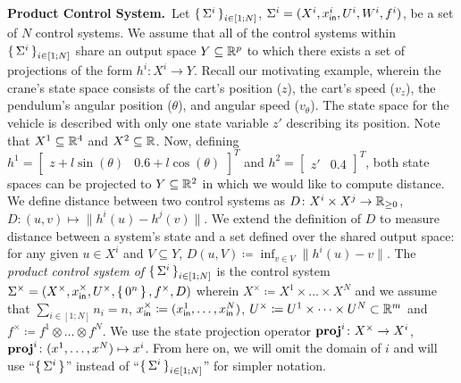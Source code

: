 
\smallskip
\noindent\textbf{Product Control System.}\
Let $\set{\Sigma^i}_{i\in [1;N]}$, $\Sigma^i=(X^i,x_{\mathsf{in}}^i,U^i,W^i,f^i)$, be a set of $N$ control systems. 
We assume that all of the control systems within $\set{\Sigma^i}_{i\in [1;N]}$ share an output space $Y\subseteq\mathbb{R}^p$ to which there exists a set of projections of the form $h^i\colon X^i\rightarrow Y$. Recall our motivating example, wherein the crane's state space consists of the cart's position ($z$), the cart's speed ($v_z$), the pendulum's angular position ($\theta$), and angular speed ($v_\theta$). The state space for the vehicle is described with only one state variable $z'$ describing its position. Note that $X^1\subseteq \mathbb{R}^4$ and $X^2\subseteq \mathbb{R}$. Now, defining $h^1=\begin{bmatrix}z+l\sin(\theta)&0.6+l\cos(\theta)\end{bmatrix}^T$ and $h^2=\begin{bmatrix}z'&0.4\end{bmatrix}^T$, both state spaces can be projected to $Y\subseteq \mathbb{R}^2$ in which we would like to compute distance.
We define distance between two control systems as $D\colon X^i\times X^j\rightarrow \mathbb{R}_{\geq 0}$, $D\colon (u,v)\mapsto\| h^i(u)-h^j(v)\|$. We extend the definition of $D$ to measure distance between a system's state and a set defined over the shared output space: for any given $u\in X^i$ and $V\subseteq Y$, $D(u,V) \coloneqq \inf_{v\in V}\|h^i(u)-v\|$. The \emph{product control system of } $\set{\Sigma^i}_{i\in [1;N]}$ is the control system $\Sigma^\times = (X^\times, x_{\mathsf{in}}^\times, U^\times, \set{0^n}, f^\times, D)$ wherein $X^\times\coloneqq X^1\times \ldots \times X^N$ and we assume that $\sum_{i\in [1;N]} n_i=n$, $x_{\mathsf{in}}^\times\coloneqq (x_{\mathsf{in}}^1,\ldots,x_{\mathsf{in}}^N)$, $U^\times\coloneqq U^1\times\dots\times U^N\subset \mathbb{R}^m$ and $f^\times\coloneqq f^{1}\otimes \ldots\otimes f^{N}$. 
We use the state projection operator $\mathbf{proj}^{i}\colon X^\times\to X^i$, $\mathbf{proj}^{i}\colon (x^1,\ldots,x^N)\mapsto x^i$. %
From here on, we will omit the domain of $i$ and will use ``$\set{\Sigma^i}$'' instead of ``$\set{\Sigma^i}_{i\in [1;N]}$'' for simpler notation.

